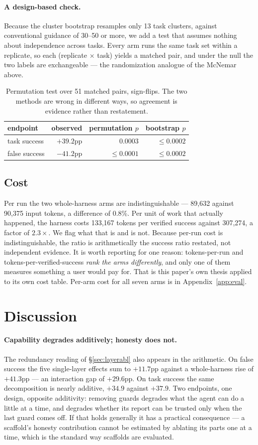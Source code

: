 \documentclass[11pt]{article}
\newcommand{\runin}[1]{\paragraph{#1}}
\begin{document}
\runin{A design-based check.}
Because the cluster bootstrap resamples only 13 task clusters, against
conventional guidance of 30--50 or more, we add a test that assumes
nothing about independence across tasks. Every arm runs the same task
set within a replicate, so each (replicate $\times$ task) yields a
matched pair, and under the null the two labels are exchangeable --- the
randomization analogue of the McNemar above.

\begin{table}[t]
\centering\small
\begin{tabular}{@{}lrrr@{}}
\toprule
endpoint & observed & permutation $p$ & bootstrap $p$\\
\midrule
task success  & $+39.2$pp & $0.0003$        & $\le 0.0002$\\
false success & $-41.2$pp & $\le 0.0001$    & $\le 0.0002$\\
\bottomrule
\end{tabular}
\caption{Permutation test over 51 matched pairs, \Resamples{}
sign-flips. The two methods are wrong in different ways, so agreement is
evidence rather than restatement.}
\label{tab:perm}
\end{table}

\subsection{Cost}
\label{sec:cost}

Per run the two whole-harness arms are indistinguishable --- 89,632
against 90,375 input tokens, a difference of 0.8\%. Per unit of work
that actually happened, the harness costs 133,167 tokens per verified
success against 307,274, a factor of $2.3\times$. We flag what that is
and is not. Because per-run cost is indistinguishable, the ratio is
arithmetically the success ratio restated, not independent evidence. It
is worth reporting for one reason: tokens-per-run and
tokens-per-verified-success \emph{rank the arms differently}, and only
one of them measures something a user would pay for. That is this
paper's own thesis applied to its own cost table. Per-arm cost for all
seven arms is in Appendix~\ref{app:eval}.

\section{Discussion}
\label{sec:disc}

\runin{Capability degrades additively; honesty does not.}
The redundancy reading of \S\ref{sec:layerabl} also appears in the
arithmetic. On false success the five single-layer effects sum to
$+11.7$pp against a whole-harness rise of $+41.3$pp --- an interaction
gap of $+29.6$pp. On task success the same decomposition is nearly
additive, $+34.9$ against $+37.9$. Two endpoints, one design, opposite
additivity: removing guards degrades what the agent can do a little at a
time, and degrades whether its report can be trusted only when the last
guard comes off. If that holds generally it has a practical consequence
--- a scaffold's honesty contribution cannot be estimated by ablating
its parts one at a time, which is the standard way scaffolds are
evaluated.
\end{document}
